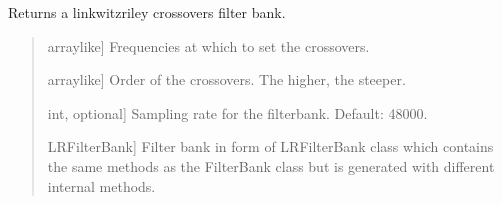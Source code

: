 \documentclass[letterpaper,10pt,english]{sphinxmanual}
\begin{document}
\begin{fulllineitems}
\label{\detokenize{modules/dsptools.filterbanks:dsptools.filterbanks.linkwitz_riley_crossovers}}
\pysigstartsignatures
{}
\pysigstopsignatures
\sphinxAtStartPar
Returns a linkwitz\sphinxhyphen{}riley crossovers filter bank.
\begin{quote}\begin{description}
\begin{description}
\sphinxlineitem{\sphinxstylestrong{freqs}}{[}array\sphinxhyphen{}like{]}
\sphinxAtStartPar
Frequencies at which to set the crossovers.

\sphinxlineitem{\sphinxstylestrong{order}}{[}array\sphinxhyphen{}like{]}
\sphinxAtStartPar
Order of the crossovers. The higher, the steeper.

\sphinxlineitem{\sphinxstylestrong{sampling\_rate\_hz}}{[}int, optional{]}
\sphinxAtStartPar
Sampling rate for the filterbank. Default: 48000.

\end{description}

\begin{description}
\sphinxlineitem{\sphinxstylestrong{fb}}{[}LRFilterBank{]}
\sphinxAtStartPar
Filter bank in form of LRFilterBank class which contains the same
methods as the FilterBank class but is generated with different
internal methods.

\end{description}

\end{description}\end{quote}

\end{fulllineitems}

\end{document}
